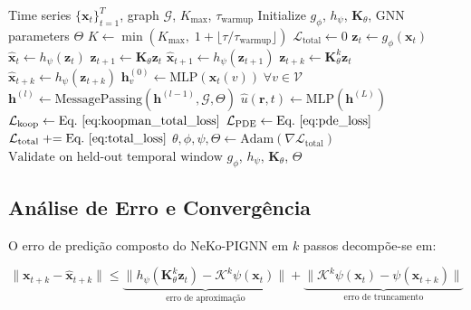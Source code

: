 \begin{algorithm}[H]
\footnotesize
\caption{NeKo-PIGNN Training with Curriculum Learning}
\label{alg:training}
\begin{algorithmic}[1]
\Require Time series $\{\mathbf{x}_t\}_{t=1}^{T}$, graph $\mathcal{G}$, $K_{\max}$, $\tau_{\text{warmup}}$
\State Initialize $g_\phi$, $h_\psi$, $\mathbf{K}_\theta$, GNN parameters $\Theta$
    \State $K \gets \min(K_{\max},\; 1 + \lfloor \tau / \tau_{\text{warmup}} \rfloor)$
    \State $\mathcal{L}_{\text{total}} \gets 0$
        \State $\mathbf{z}_t \gets g_\phi(\mathbf{x}_t)$ 
        \State $\hat{\mathbf{x}}_t \gets h_\psi(\mathbf{z}_t)$ 
        \State $\mathbf{z}_{t+1} \gets \mathbf{K}_\theta \mathbf{z}_t$ 
        \State $\hat{\mathbf{x}}_{t+1} \gets h_\psi(\mathbf{z}_{t+1})$
            \State $\mathbf{z}_{t+k} \gets \mathbf{K}_\theta^k \mathbf{z}_t$
            \State $\hat{\mathbf{x}}_{t+k} \gets h_\psi(\mathbf{z}_{t+k})$
        \EndFor
        \State $\mathbf{h}^{(0)}_v \gets \text{MLP}(\mathbf{x}_t(v)) \;\forall v \in \mathcal{V}$
            \State $\mathbf{h}^{(l)} \gets \text{MessagePassing}(\mathbf{h}^{(l-1)}, \mathcal{G}, \Theta)$
        \EndFor
        \State $\hat{u}(\mathbf{r}, t) \gets \text{MLP}(\mathbf{h}^{(L)})$ 
        \State $\mathcal{L}_{\text{koop}} \gets \text{Eq.~\ref{eq:koopman_total_loss}}$
        \State $\mathcal{L}_{\text{PDE}} \gets \text{Eq.~\ref{eq:pde_loss}}$
        \State $\mathcal{L}_{\text{total}} \mathrel{+}= \text{Eq.~\ref{eq:total_loss}}$
    \EndFor
    \State $\theta, \phi, \psi, \Theta \gets \text{Adam}(\nabla \mathcal{L}_{\text{total}})$
        \State $\text{Validate on held-out temporal window}$
    \EndIf
\EndFor
\Return $g_\phi$, $h_\psi$, $\mathbf{K}_\theta$, $\Theta$
\end{algorithmic}
\end{algorithm}

\subsection{Análise de Erro e Convergência}
\label{sec:error-analysis}

O erro de predição composto do NeKo-PIGNN em $k$ passos decompõe-se em:

\begin{equation}
\|\mathbf{x}_{t+k} - \hat{\mathbf{x}}_{t+k}\| \leq 
\underbrace{\|h_\psi(\mathbf{K}_\theta^k \mathbf{z}_t) - \mathcal{K}^k \psi(\mathbf{x}_t)\|}_{\text{erro de aproximação}} + 
\underbrace{\|\mathcal{K}^k \psi(\mathbf{x}_t) - \psi(\mathbf{x}_{t+k})\|}_{\text{erro de truncamento}}
\label{eq:error_bound}
\end{equation}

